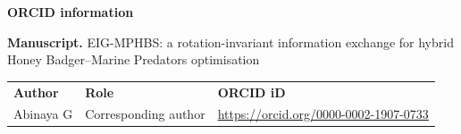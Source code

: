 \documentclass[11pt]{article}
\begin{document}
{\large\bfseries ORCID information}

\textbf{Manuscript.} EIG-MPHBS: a rotation-invariant information exchange for hybrid Honey Badger--Marine Predators
optimisation

\begin{tabular}{@{}lll@{}}
\textbf{Author} & \textbf{Role} & \textbf{ORCID iD} \\[2pt]
Abinaya G & Corresponding author & \href{https://orcid.org/0000-0002-1907-0733}{https://orcid.org/0000-0002-1907-0733} \\
\end{tabular}
\end{document}
